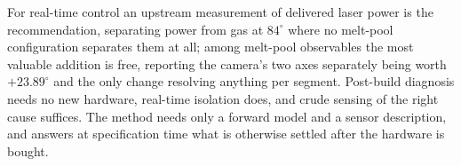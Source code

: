 \documentclass[final,5p,times,twocolumn]{elsarticle}
\begin{document}
For real-time control an upstream measurement of delivered laser power is the
recommendation, separating power from gas at $84^\circ$ where no melt-pool
configuration separates them at all; among melt-pool observables the most
valuable addition is free, reporting the camera's two axes separately being worth
$+23.89^\circ$ and the only change resolving anything per segment. Post-build
diagnosis needs no new hardware, real-time isolation does, and crude sensing of
the right cause suffices. The method needs only a forward model and a sensor
description, and answers at specification time what is otherwise settled after
the hardware is bought.

\end{document}
